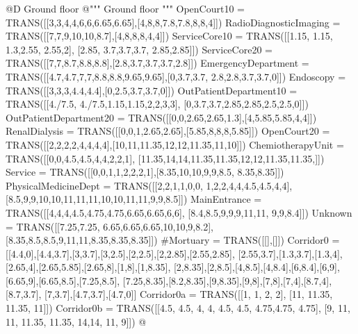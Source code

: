 \documentclass[11pt,oneside]{article}    %
\begin{document}
@D Ground floor 
@{""" Ground floor """
OpenCourt10 = TRANS([[3,3,4,4,6,6,6.65,6.65],[4,8,8,7.8,7.8,8,8,4]])
RadioDiagnosticImaging = TRANS([[7,7,9,10,10,8.7],[4,8,8,8,4,4]])
ServiceCore10 = TRANS([[1.15, 1.15, 1.3,2.55, 2.55,2], [2.85, 3.7,3.7,3.7, 
    2.85,2.85]])
ServiceCore20 = TRANS([[7,7,8.7,8.8,8.8],[2.8,3.7,3.7,3.7,2.8]])
EmergencyDepartment = TRANS([[4.7,4.7,7,7,8.8,8.8,9.65,9.65],[0,3.7,3.7,
    2.8,2.8,3.7,3.7,0]])
Endoscopy = TRANS([[3,3,3,4.4,4.4],[0,2.5,3.7,3.7,0]])
OutPatientDepartment10 = TRANS([[4./7.5, 4./7.5,1.15,1.15,2,2,3,3],
    [0,3.7,3.7,2.85,2.85,2.5,2.5,0]])
OutPatientDepartment20 = TRANS([[0,0,2.65,2.65,1.3],[4,5.85,5.85,4,4]])
RenalDialysis = TRANS([[0,0,1,2.65,2.65],[5.85,8,8,8,5.85]])
OpenCourt20 = TRANS([[2,2,2,2,4,4,4,4],[10,11,11.35,12,12,11.35,11,10]])
ChemiotherapyUnit = TRANS([[0,0,4.5,4.5,4,4,2,2,1],
    [11.35,14,14,11.35,11.35,12,12,11.35,11.35,]])
Service = TRANS([[0,0,1,1,2,2,2,1],[8.35,10,10,9,9,8.5, 8.35,8.35]])
PhysicalMedicineDept = TRANS([[2,2,1,1,0,0, 1,2,2,4,4,4.5,4.5,4,4],
    [8.5,9,9,10,10,11,11,11,10,10,11,11,9,9,8.5]])
MainEntrance = TRANS([[4,4,4,4.5,4.75,4.75,6.65,6.65,6,6],
    [8.4,8.5,9,9,9,11,11, 9,9,8.4]])
Unknown = TRANS([[7.25,7.25, 6.65,6.65,6.65,10,10,9,8.2],
    [8.35,8.5,8.5,9,11,11,8.35,8.35,8.35]])
#Mortuary = TRANS([[],[]])
Corridor0 = [[4.4,0],[4.4,3.7],[3,3.7],[3,2.5],[2,2.5],[2,2.85],[2.55,2.85],
    [2.55,3.7],[1.3,3.7],[1.3,4],[2.65,4],[2.65,5.85],[2.65,8],[1,8],[1,8.35],
    [2,8.35],[2,8.5],[4,8.5],[4,8.4],[6,8.4],[6,9],[6.65,9],[6.65,8.5],[7.25,8.5],
    [7.25,8.35],[8.2,8.35],[9,8.35],[9,8],[7,8],[7,4],[8.7,4],[8.7,3.7],
    [7,3.7],[4.7,3.7],[4.7,0]]
Corridor0a = TRANS([[1, 1, 2, 2], [11, 11.35, 11.35, 11]])
Corridor0b = TRANS([[4.5, 4.5, 4, 4, 4.5, 4.5, 4.75,4.75, 4.75],
    [9, 11, 11, 11.35, 11.35, 14,14, 11, 9]])
@}
\end{document}
